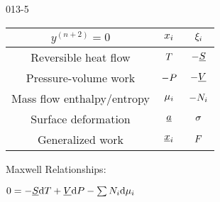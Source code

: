 \begin{mitframe}{013-5} %

    

\begin{longtable}{ | c | c | c | } 
 \hline
 	$ y^{(n+2)}= 0$& $\conjcoor$ & $\conjcoortwo_{\state}$ \\ \hline
	Reversible heat flow & $\Temp$ & $-\uline{\entropy}$ \\ \hline 
	Pressure-volume work & $-\p$ & $-\uline{\vol}$  \\ \hline
 	Mass flow enthalpy/entropy& $\chempot_{\state}$ & $-\nummoles_{\state}$ \\ \hline   
	Surface deformation & $\totalsa$ & $\surftens$ \\ \hline   
    Generalized work & $\gendisp_{\state}$ & $\force$ \\ \hline
 
 
 
 
 
\end{longtable}

    
    
\begin{listone}
        
    \item Maxwell Relationships:
        
    \item $0 = -\uline{\entropy}\mathrm{d}\Temp + \uline{\vol}\mathrm{d}\p - \sum\nolimits\nummoles_{\state}\mathrm{d}\chempot_{\state}$
    

    
\end{listone}			

\end{mitframe}